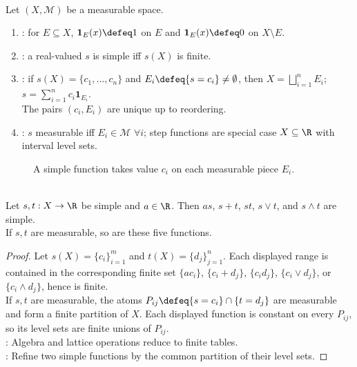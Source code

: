 \begin{definition} \label{def:simple-functions-measurable} \\
Let $(X,\mathcal{M})$ be a measurable space.
\begin{enumerate}[label=(\roman*)]
\setlength{\itemsep}{0pt}
\item {}: for $E\subseteq X$, $\mathbf{1}_E(x)\defeq1$ on $E$ and $\mathbf{1}_E(x)\defeq0$ on $X\setminus E$.
\item {}: a real-valued $s$ is simple iff $s(X)$ is finite.
\item {}: if $s(X)=\{c_1,\ldots,c_n\}$ and $E_i\defeq\{s=c_i\}\neq\emptyset$, then $X=\bigsqcup\limits_{i=1}^{n}E_i$; $s=\sum\limits_{i=1}^{n}c_i\mathbf{1}_{E_i}$.\\
The pairs $(c_i,E_i)$ are unique up to reordering.
\item {}: $s$ measurable iff $E_i\in\mathcal{M}$ $\forall i$; step functions are special case $X\subseteq\R$ with interval level sets.
\end{enumerate}
\end{definition}

\begin{figure}[H]
  \centering
  
  \caption{A simple function takes value $c_i$ on each measurable piece $E_i$.}
  \label{fig:simple-function-measurable-partition}
\end{figure}

\begin{proposition} \label{prop:simple-functions-lattice-algebra} \\
Let $s,t:X\to\R$ be simple and $a\in\R$. Then $as$, $s+t$, $st$, $s\vee t$, and $s\wedge t$ are simple.\\
If $s,t$ are measurable, so are these five functions.
\begin{proof}
Let $s(X)=\{c_i\}_{i=1}^{m}$ and $t(X)=\{d_j\}_{j=1}^{n}$. Each displayed range is contained in the corresponding finite set $\{ac_i\}$, $\{c_i+d_j\}$, $\{c_id_j\}$, $\{c_i\vee d_j\}$, or $\{c_i\wedge d_j\}$, hence is finite.\\
If $s,t$ are measurable, the atoms $P_{ij}\defeq\{s=c_i\}\cap\{t=d_j\}$ are measurable and form a finite partition of $X$. Each displayed function is constant on every $P_{ij}$, so its level sets are finite unions of $P_{ij}$.\\
: Algebra and lattice operations reduce to finite tables.\\
: Refine two simple functions by the common partition of their level sets.
\end{proof}
\end{proposition}

